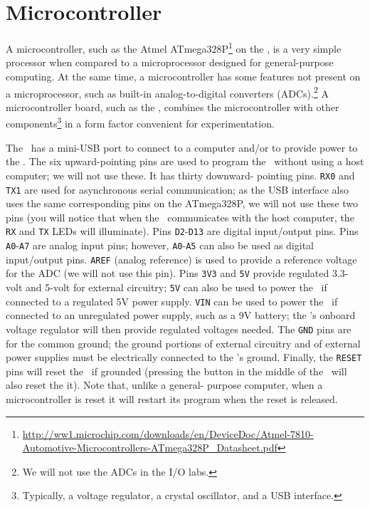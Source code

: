 \section{Microcontroller}

A microcontroller, such as the Atmel ATmega328P\footnote{\url{http://ww1.microchip.com/downloads/en/DeviceDoc/Atmel-7810-Automotive-Microcontrollers-ATmega328P_Datasheet.pdf}}
on the \nano, is a very simple processor when compared to a
microprocessor designed for general-purpose computing. At the same time, a
microcontroller has some features not present on a microprocessor, such as
built-in analog-to-digital converters (ADCs).\footnote{We will not use the ADCs
in the I/O labs.} A microcontroller board, such as the \nano, combines
the microcontroller with other components\footnote{Typically, a voltage
regulator, a crystal oscillator, and a USB interface.} in a form factor
convenient for experimentation.

The \nano\ has a mini-USB port to connect to a computer and/or to provide power
to the \nano. The six upward-pointing pins are used to program the \nano\
without using a host computer; we will not use these. It has thirty downward-
pointing pins. \texttt{RX0} and \texttt{TX1} are used for asynchronous serial
communication; as the USB interface also uses the same corresponding pins on
the ATmega328P, we will not use these two pins (you will notice that when the
\nano\ communicates with the host computer, the \texttt{RX} and \texttt{TX}
LEDs will illuminate). Pins \texttt{D2}-\texttt{D13} are digital input/output
pins. Pins \texttt{A0}-\texttt{A7} are analog input pins; however,
\texttt{A0}-\texttt{A5} can also be used as digital input/output pins.
\texttt{AREF} (analog reference) is used to provide a reference voltage for the
ADC (we will not use this pin). Pins \texttt{3V3} and \texttt{5V} provide
regulated 3.3-volt and 5-volt for external circuitry; \texttt{5V} can also be
used to power the \nano\ if connected to a regulated 5V power supply.
\texttt{VIN} can be used to power the \nano\ if connected to an unregulated
power supply, such as a 9V battery; the \nano's onboard voltage regulator will
then provide regulated voltages needed. The \texttt{GND} pins are for the
common ground; the ground portions of external circuitry and of external power
supplies must be electrically connected to the \nano's ground. Finally, the
\texttt{RESET} pins will reset the \nano\ if grounded (pressing the button in
the middle of the \nano\ will also reset the it). Note that, unlike a general-
purpose computer, when a microcontroller is reset it will restart its program
when the reset is released.

